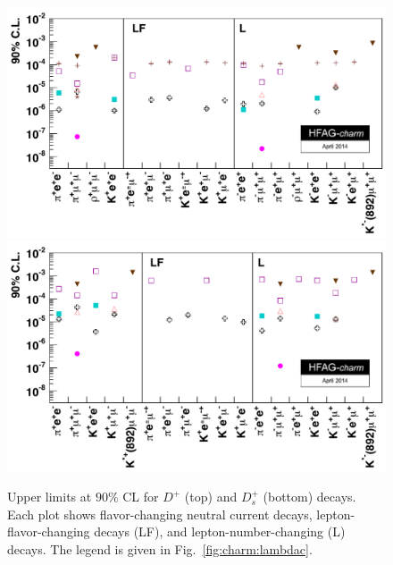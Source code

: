 \begin{figure}
\begin{center}
\includegraphics[width=5.0in]{figures/charm/rare_Dplus.pdf}
\vskip0.10in
\includegraphics[width=5.0in]{figures/charm/rare_Dsplus.pdf}
\caption{Upper limits at $90\%$ CL for $D^+$ (top) and $D_s^+$ (bottom) 
decays. Each plot shows flavor-changing neutral current decays, 
lepton-flavor-changing decays (LF), and lepton-number-changing (L) decays. 
The legend is given in Fig.~\ref{fig:charm:lambdac}.}
\label{fig:charm:rare_charged}
\end{center}
\end{figure}

